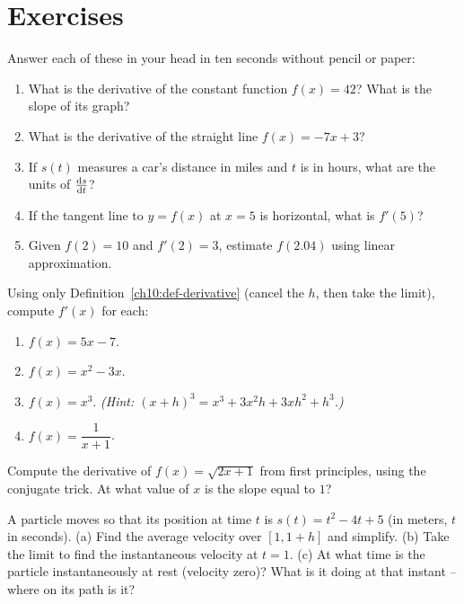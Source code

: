 \section{Exercises}
\label{ch10:exercises}

\begin{exercise}
\label{ch10:ex-mental-checks}
Answer each of these in your head in ten seconds without pencil or paper:
\begin{enumerate}[label=(\alph*)]
  \item What is the derivative of the constant function $f(x) = 42$? What is the slope of its graph?
  \item What is the derivative of the straight line $f(x) = -7x + 3$?
  \item If $s(t)$ measures a car's distance in miles and $t$ is in hours, what are the units of $\frac{\mathrm{d} s}{\mathrm{d} t}$?
  \item If the tangent line to $y = f(x)$ at $x = 5$ is horizontal, what is $f'(5)$?
  \item Given $f(2) = 10$ and $f'(2) = 3$, estimate $f(2.04)$ using linear approximation.
\end{enumerate}
\end{exercise}

\begin{exercise}
\label{ch10:ex-warmups}
Using only Definition~\ref{ch10:def-derivative} (cancel the $h$, then take the
limit), compute $f'(x)$ for each:
\begin{enumerate}[label=(\alph*)]
  \item $f(x) = 5x - 7$.
  \item $f(x) = x^2 - 3x$.
  \item $f(x) = x^3$. \emph{(Hint: $(x+h)^3 = x^3 + 3x^2 h + 3x h^2 + h^3$.)}
  \item $f(x) = \dfrac{1}{x + 1}$.
\end{enumerate}
\end{exercise}

\begin{exercise}
\label{ch10:ex-root}
Compute the derivative of $f(x) = \sqrt{2x + 1}$ from first principles, using the
conjugate trick. At what value of $x$ is the slope equal to $1$?
\end{exercise}

\begin{exercise}
\label{ch10:ex-speed}
A particle moves so that its position at time $t$ is $s(t) = t^2 - 4t + 5$ (in
meters, $t$ in seconds). (a) Find the average velocity over $[1, 1+h]$ and
simplify. (b) Take the limit to find the instantaneous velocity at $t = 1$.
(c) At what time is the particle instantaneously at rest (velocity zero)? What is
it doing at that instant -- where on its path is it?
\end{exercise}


